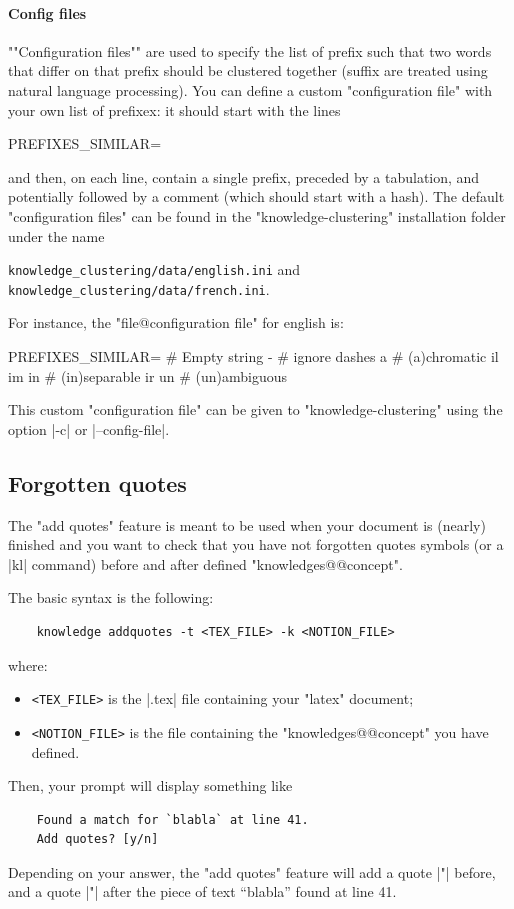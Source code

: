\documentclass{article}
\begin{document}
\paragraph{Config files} \AP""Configuration files"" are used to specify
the list of 
prefix such that two words that differ on that prefix should be clustered 
together (suffix are treated using natural language processing).
You can define a custom "configuration file" with your own list of prefixex:
it should start with the lines 
\begin{spverbatim}
    [DEFAULT]
    PREFIXES_SIMILAR=
\end{spverbatim}
and then, on each line, contain a single prefix, preceded by a tabulation,
and potentially followed by a comment (which should start with a hash).
The default "configuration files" can be found
in the "knowledge-clustering" installation folder under the name
\begin{center}%
    \texttt{knowledge\_clustering/data/english.ini}
    and \texttt{knowledge\_clustering/data/french.ini}.
\end{center}
For instance, the "file@configuration file" for english is:
\begin{spverbatim}
    [DEFAULT]
    PREFIXES_SIMILAR=
        # Empty string
        - # ignore dashes
        a # (a)chromatic
        il
        im
        in # (in)separable
        ir
        un # (un)ambiguous    
\end{spverbatim}
This custom "configuration file" can be given to "knowledge-clustering"
using the option \spverb|-c| or \spverb|--config-file|.


\subsection{Forgotten quotes}


The "add quotes" feature is meant to be used when your document is (nearly)
finished and you want to check that you have not forgotten quotes symbols
(or a \spverb|kl{}| command) before and after defined "knowledges@@concept".

The basic syntax is the following:
\begin{verbatim}
    knowledge addquotes -t <TEX_FILE> -k <NOTION_FILE> 
\end{verbatim}
where:
\begin{itemize}
    \item \texttt{<TEX\_FILE>} is the \spverb|.tex| file containing your "latex"
    document;
    \item \texttt{<NOTION\_FILE>} is the file containing the
    "knowledges@@concept" you have defined.
\end{itemize}
Then, your prompt will display something like
\begin{verbatim}
    Found a match for `blabla` at line 41.
    Add quotes? [y/n]
\end{verbatim}
Depending on your answer, the "add quotes" feature will add a quote
%
\spverb|"| before, and a quote \spverb|"| after 
%
the piece of text ``blabla'' found at line 41.
\end{document}
